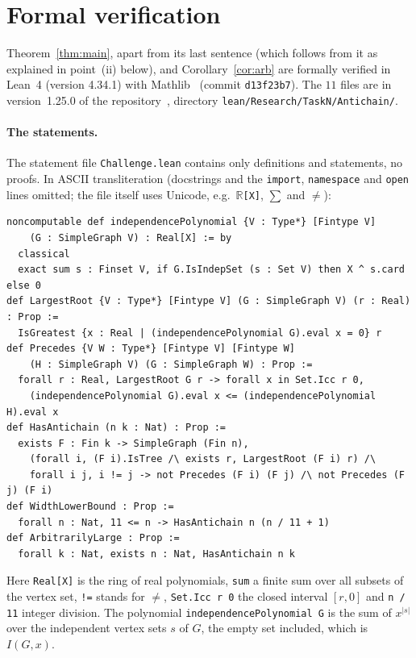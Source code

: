 \documentclass[11pt]{article}
\theoremstyle{definition}
\theoremstyle{remark}
\newcommand{\repoversion}{1.25.0}
\begin{document}
{\sloppy
\section{Formal verification}\label{sec:lean}

Theorem~\ref{thm:main}, apart from its last sentence (which follows from it
as explained in point~(ii) below), and Corollary~\ref{cor:arb} are formally
verified in Lean~4 (version 4.34.1)
with Mathlib~\cite{mathlib} (commit \texttt{d13f23b7}). The $11$ files are in
version~\repoversion{} of the repository~\cite{repo}, directory
\texttt{lean/Research/TaskN/Antichain/}.

\paragraph{The statements.}
The statement file \texttt{Challenge.lean} contains only definitions and
statements, no proofs. In ASCII transliteration (docstrings and the
\texttt{import}, \texttt{namespace} and \texttt{open} lines omitted; the file
itself uses Unicode, e.g.\ \texttt{$\mathbb{R}$[X]}, $\sum$ and $\ne$):
{\footnotesize
\begin{verbatim}
noncomputable def independencePolynomial {V : Type*} [Fintype V]
    (G : SimpleGraph V) : Real[X] := by
  classical
  exact sum s : Finset V, if G.IsIndepSet (s : Set V) then X ^ s.card else 0
def LargestRoot {V : Type*} [Fintype V] (G : SimpleGraph V) (r : Real) : Prop :=
  IsGreatest {x : Real | (independencePolynomial G).eval x = 0} r
def Precedes {V W : Type*} [Fintype V] [Fintype W]
    (H : SimpleGraph V) (G : SimpleGraph W) : Prop :=
  forall r : Real, LargestRoot G r -> forall x in Set.Icc r 0,
    (independencePolynomial G).eval x <= (independencePolynomial H).eval x
def HasAntichain (n k : Nat) : Prop :=
  exists F : Fin k -> SimpleGraph (Fin n),
    (forall i, (F i).IsTree /\ exists r, LargestRoot (F i) r) /\
    forall i j, i != j -> not Precedes (F i) (F j) /\ not Precedes (F j) (F i)
def WidthLowerBound : Prop :=
  forall n : Nat, 11 <= n -> HasAntichain n (n / 11 + 1)
def ArbitrarilyLarge : Prop :=
  forall k : Nat, exists n : Nat, HasAntichain n k
\end{verbatim}}
\noindent Here \texttt{Real[X]} is the ring of real polynomials,
\texttt{sum} a finite sum over all subsets of the vertex set, \texttt{!=}
stands for $\ne$, \texttt{Set.Icc r 0} the closed interval $[r,0]$ and
\texttt{n / 11} integer division. The polynomial
\texttt{independencePolynomial G} is the sum of $x^{|s|}$ over the independent
vertex sets $s$ of $G$, the empty set included, which is $I(G,x)$.
}
\end{document}
